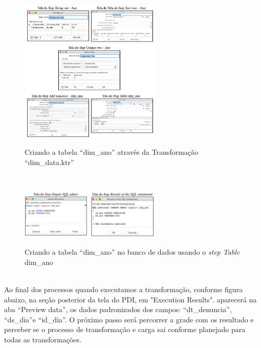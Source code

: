 \begin{figure}[H]
	\vspace*{0,2cm}
    \centering
    \caption{Criando a tabela ``dim\_ano'' atrav\'{e}s da Transforma\c{c}\~{a}o ``dim\_data.ktr''}
    \includegraphics[width=0.6\textwidth]{./04-figuras/figura-dim-ano}
    \label{fig:ilustfigdimano}
\end{figure}
\vspace*{-0,9cm}
{\raggedright {}} \\

\begin{figure}[H]
	\vspace*{0,2cm}
    \centering
    \caption{Criando a tabela ``dim\_ano'' no banco de dados usando o \textit{step Table} dim\_ano}
    \includegraphics[width=0.6\textwidth]{./04-figuras/figura-tb-dim-ano}
    \label{fig:ilustfigtbdimano}
\end{figure}
\vspace*{-0,9cm}
{\raggedright {}} \\

Ao final dos processos quando executamos a transforma\c{c}\~{a}o, conforme figura abaixo, na se\c{c}\~{a}o posterior da tela do PDI, 
em "Execution Results". aparecer\'{a} na aba ``Preview data'', os dados padronizados dos campos: 
``dt\_denuncia'', ``ds\_dia''e ``id\_dia''. O pr\'{o}ximo passo ser\'{a} percorrer a grade com os resultado e 
perceber se o processo de transforma\c{c}\~{a}o e carga sai conforme planejado para todas as transforma\c{c}\~{o}es. 

